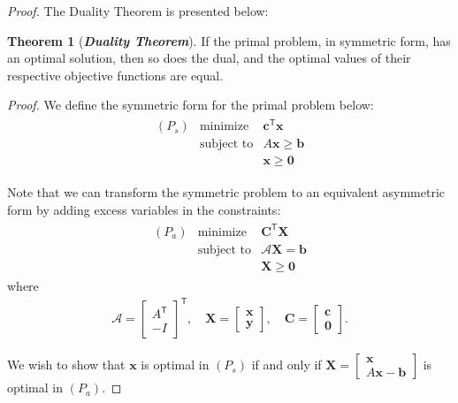 \documentclass[12pt]{article}
\theoremstyle{definition}
\newcommand{\vc}[1]{\boldsymbol{#1}}
\newcommand{\tran}{\mathsf{T}}
\newtheorem{theorem}{Theorem}
\begin{document}
\begin{proof}
  The Duality Theorem is presented below:
  \begin{theorem}[\textbf{\emph{Duality Theorem}}] If the primal problem, in symmetric form,
    has an optimal solution, then so does the dual, and the optimal values of their
    respective objective functions are equal.
  \end{theorem}

  \emph{Proof.} We define the symmetric form for the primal problem below:
  \begin{align*}
    \begin{array}{lrl}
      (P_s) & \text{minimize} & \vc{c}^\tran \vc{x} \\
      & \text{subject to} & A\vc{x} \geq \vc{b} \\
      & & \vc{x} \geq \vc{0}
    \end{array}
  \end{align*}

  Note that we can transform the symmetric problem to an equivalent asymmetric form
  by adding excess variables in the constraints:
  \begin{align*}
    \begin{array}{lrl}
      (P_a) & \text{minimize} & \vc{C}^\tran \vc{X} \\
      & \text{subject to} & \mathscr{A}\vc{X} = \vc{b} \\
      & & \vc{X} \geq \vc{0}
    \end{array}
  \end{align*}
  where
  \begin{align*}
    \mathscr{A} = \begin{bmatrix}A^\tran \\ -I\end{bmatrix}^\tran, \quad \vc{X} = \begin{bmatrix}\vc{x} \\ \vc{y}\end{bmatrix},
    \quad \vc{C} = \begin{bmatrix}\vc{c} \\ \vc{0}\end{bmatrix}.
  \end{align*}

  We wish to show that $\vc{x}$ is optimal in $(P_s)$ if and only if $\vc{X} = \begin{bmatrix}\vc{x} \\ A\vc{x} - \vc{b}\end{bmatrix}$
  is optimal in $(P_a)$.


\end{proof}
\end{document}
